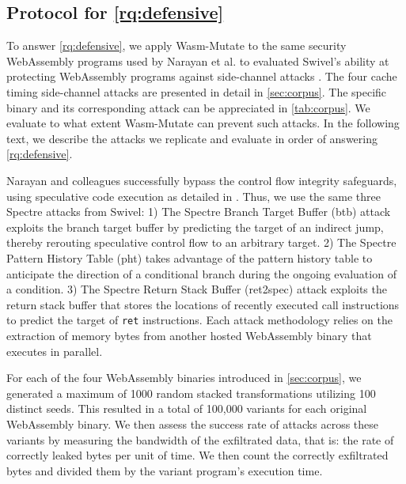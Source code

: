 \documentclass[a4paper,fleqn]{cas-dc}
\newcommand*\badge[1]{ \colorbox{red}{\color{white}#1}}
\newcommand{\tool}{{\sc Wasm-Mutate}\xspace}
\newcommand{\Wasm}{WebAssembly\xspace}
\newcommand{\wasm}{\Wasm}
\newcommand{\todo}[1]{%
\refstepcounter{todo}
\noindent\textbf{\badge{TODO}} {\color{red}#1}
\addcontentsline{td}{todo}
{\color{red}\thesection.\thetodo\xspace #1}}
\begin{document}
\subsection{Protocol for \ref{rq:defensive}}
\label{protocol:rq3}

\newcommand{\poct}{\emph{Cache timing POC}\xspace}
\newcommand{\pocd}{\emph{Differential computing POC}\xspace}
\newcommand{\pocp}{\emph{Port contention POC}\xspace}

To answer \ref{rq:defensive}, we apply \tool to the same security \wasm programs used by Narayan et al. to evaluated Swivel's ability at protecting \wasm programs against side-channel attacks \cite{Swivel}. 
The four cache timing side-channel attacks are presented in detail in \autoref{sec:corpus}. 
The specific binary and its corresponding attack can be appreciated in \autoref{tab:corpus}.
We evaluate to what extent \tool can prevent such attacks.
In the following text, we describe the attacks we replicate and evaluate in order of answering \ref{rq:defensive}.


Narayan and colleagues successfully bypass the control flow integrity safeguards, using speculative code execution as detailed in \cite{Spectre}. 
Thus, we use the same three Spectre attacks from Swivel:
1) The Spectre Branch Target Buffer (btb) attack exploits the branch target buffer by predicting the target of an indirect jump, thereby rerouting speculative control flow to an arbitrary target.
2) The Spectre Pattern History Table (pht) takes advantage of the pattern history table to anticipate the direction of a conditional branch during the ongoing evaluation of a condition. 
3) The Spectre Return Stack Buffer (ret2spec) attack exploits the return stack buffer that stores the locations of recently executed call instructions to predict the target of \texttt{ret} instructions. 
Each attack methodology relies on the extraction of memory bytes from another hosted \wasm binary that executes in parallel.


For each of the four \wasm binaries introduced in \autoref{sec:corpus}, we generated a maximum of 1000 random stacked transformations utilizing 100 distinct seeds. 
This resulted in a total of 100,000 variants for each original \wasm binary.
We then assess the success rate of attacks across these variants by measuring the bandwidth of the exfiltrated data, that is: the rate of correctly leaked bytes per unit of time. 
We then count the correctly exfiltrated bytes and divided them by the variant program's execution time. 
\end{document}
